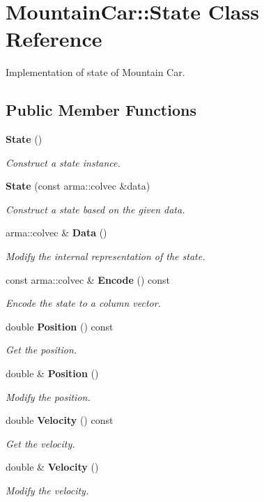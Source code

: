 \section{Mountain\+Car\+:\+:State Class Reference}
\label{classmlpack_1_1rl_1_1MountainCar_1_1State}


Implementation of state of Mountain Car.  


\subsection*{Public Member Functions}
\begin{DoxyCompactItemize}
\item 
\textbf{ State} ()
\begin{DoxyCompactList}\small\item\em Construct a state instance. \end{DoxyCompactList}\item 
\textbf{ State} (const arma\+::colvec \&data)
\begin{DoxyCompactList}\small\item\em Construct a state based on the given data. \end{DoxyCompactList}\item 
arma\+::colvec \& \textbf{ Data} ()
\begin{DoxyCompactList}\small\item\em Modify the internal representation of the state. \end{DoxyCompactList}\item 
const arma\+::colvec \& \textbf{ Encode} () const
\begin{DoxyCompactList}\small\item\em Encode the state to a column vector. \end{DoxyCompactList}\item 
double \textbf{ Position} () const
\begin{DoxyCompactList}\small\item\em Get the position. \end{DoxyCompactList}\item 
double \& \textbf{ Position} ()
\begin{DoxyCompactList}\small\item\em Modify the position. \end{DoxyCompactList}\item 
double \textbf{ Velocity} () const
\begin{DoxyCompactList}\small\item\em Get the velocity. \end{DoxyCompactList}\item 
double \& \textbf{ Velocity} ()
\begin{DoxyCompactList}\small\item\em Modify the velocity. \end{DoxyCompactList}\end{DoxyCompactItemize}

